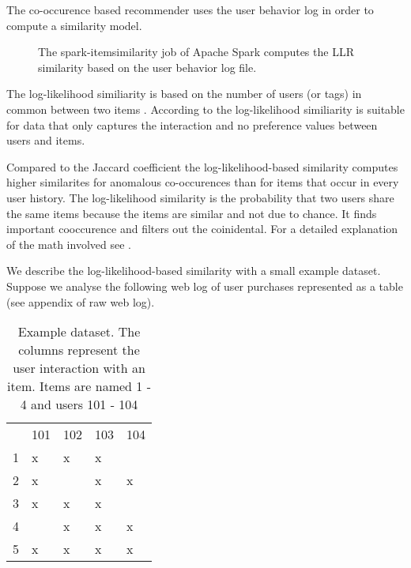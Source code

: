 The co-occurence based recommender uses the user behavior log in order to compute a similarity model. 

\begin{figure}
\centering
{}
\caption{The {\ttfamily spark-itemsimilarity} job of Apache Spark computes the LLR similarity based on the user behavior log file.}
\end{figure}

 The log-likelihood similiarity is based on the number of users (or tags) in common between two items \cite{montgomery}. According to \cite{Dunning93} the log-likelihood similiarity is suitable for data that only captures the interaction and no preference values between users and items. 

Compared to the Jaccard coefficient \cite{Hartung} the log-likelihood-based similarity computes higher similarites for anomalous co-occurences than for items that occur in every user history. The log-likelihood similarity  is the probability that two users share the same items because the items are similar and not due to chance. It finds important cooccurence and filters out the coinidental. For a detailed explanation of the math involved see \cite{Dunning93}. 

We describe the log-likelihood-based similarity with a small example dataset. Suppose we analyse the following web log of user purchases represented as a table (see appendix of raw web log).

\begin{table}
\begin{center}
\begin{tabular}{rllll}
 & 101 & 102 & 103 & 104\\
1 & x & x & x & \\
2 & x &  & x & x\\
3 & x & x & x & \\
4 &  & x & x & x\\
5 & x & x & x & x\\
\end{tabular}
\end{center}
\caption{Example dataset. The columns represent the user interaction with an item. Items are named 1 - 4 and users 101 - 104}
\label{tbl:llr}
\end{table}

